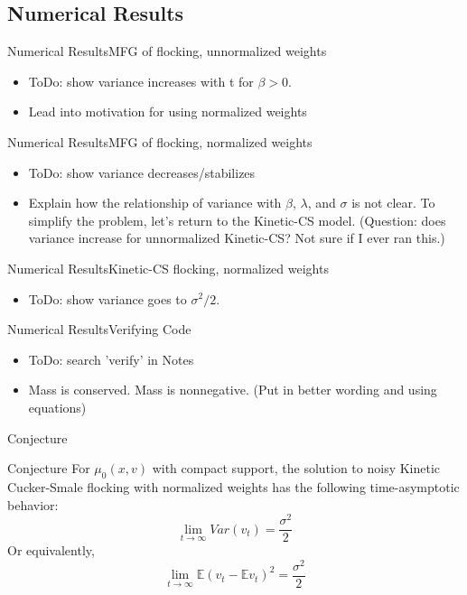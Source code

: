 \documentclass{beamer}
\begin{document}
\subsection{Numerical Results}

\begin{frame}{Numerical Results}{MFG of flocking, unnormalized weights}
	\begin{itemize}
		\item {
			ToDo: show variance increases with t for $\beta >0$.
		}
		\item {
			Lead into motivation for using normalized weights
		}
	\end{itemize}
\end{frame}

\begin{frame}{Numerical Results}{MFG of flocking, normalized weights}
	\begin{itemize}
		\item {
			ToDo: show variance decreases/stabilizes
		}
		\item {
			Explain how the relationship of variance with $\beta$, $\lambda$, and $\sigma$ is not clear. To simplify the problem, let's return to the Kinetic-CS model. (Question: does variance increase for unnormalized Kinetic-CS? Not sure if I ever ran this.)
		}
	\end{itemize}
\end{frame}

\begin{frame}{Numerical Results}{Kinetic-CS flocking, normalized weights}
	\begin{itemize}
		\item {
			ToDo: show variance goes to $\sigma^2/2$.
		}
	\end{itemize}
\end{frame}

\begin{frame}{Numerical Results}{Verifying Code}
	\begin{itemize}
		\item {
			ToDo: search 'verify' in Notes
		}
		\item {
			Mass is conserved. Mass is nonnegative. (Put in better wording and using equations)
		}
	\end{itemize}
\end{frame}

\begin{frame}{Conjecture}
	\begin{block}{Conjecture}
		For $\mu_0(x,v)$ with compact support, the solution to noisy Kinetic Cucker-Smale flocking with normalized weights has the following time-asymptotic behavior:
			\begin{equation}
			\lim_{t \rightarrow \infty} Var(v_t)=\frac{\sigma^2}{2} 
			\end{equation}
			Or equivalently,
			\begin{equation}
			\lim_{t \rightarrow \infty} \mathbb{E}(v_t-\mathbb{E}v_t)^2=\frac{\sigma^2}{2}
			\end{equation}
	\end{block}
\end{frame}
\end{document}
